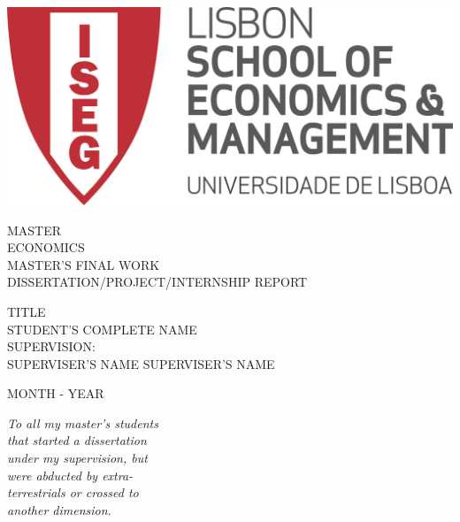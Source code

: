 \documentclass [12pt,a4paper,oneside]{article}
\begin{document}
\begin{titlepage}

\pagestyle{empty}
\centering

\begin{flushleft}
    \includegraphics[width=0.3\linewidth]{graphics/Logotipo_ISEG.png}
\end{flushleft}    
    \vspace{3cm}
    {\uppercase{\Large master}} \\ [0.5cm]
    {\uppercase{\Large economics}} \\ [2cm]%
    {\uppercase{\Large master's final work}} \\ [0.5cm]
  {\uppercase{\Large dissertation/project/internship report }} \\ [2cm] %
\begin{flushleft}
{\uppercase{\Large title }} \\ [1.5cm] %
{\uppercase{\Large student's complete name }}  \\ [2cm]%
{\uppercase{\Large supervision:}}  \\ [0.5cm]
{\uppercase{\Large superviser's name }}  %
{\uppercase{\Large superviser's name }}  %
\end{flushleft}
    \vfill
    {\uppercase{\Large  month - year}}  %
 \clearpage 
 \end{titlepage}


\thispagestyle{empty}%
\vspace*{\fill} %
\begin{flushright}
\textit{%
To all my master’s students\\
that started a dissertation\\
under my supervision, but\\
were abducted by extra-\\
terrestrials or crossed to\\
another dimension.
}
\end{flushright}
\end{document}
